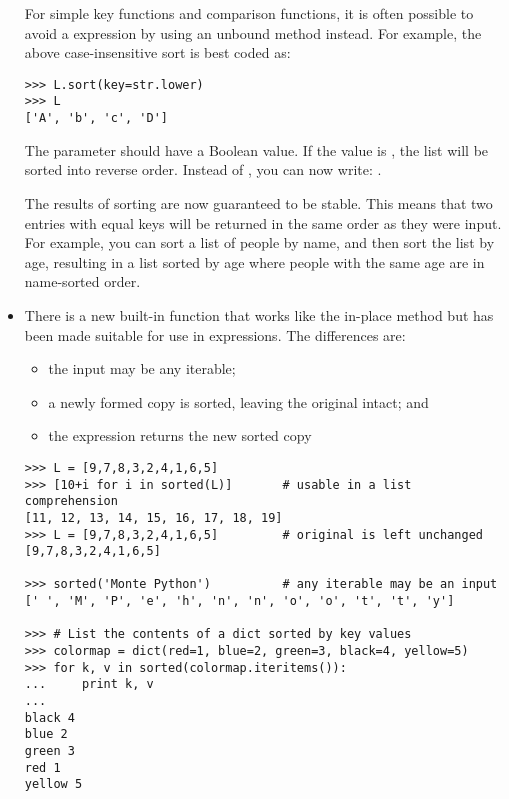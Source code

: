 \documentclass{howto}
\begin{document}
\begin{itemize}
For simple key functions and comparison functions, it is often
possible to avoid a  expression by using an unbound
method instead.  For example, the above case-insensitive sort is best
coded as:

\begin{verbatim}
>>> L.sort(key=str.lower)
>>> L
['A', 'b', 'c', 'D']
\end{verbatim}       

The  parameter should have a Boolean value.  If the value is
, the list will be sorted into reverse order.  Instead
of , you can now write:
.

The results of sorting are now guaranteed to be stable.  This means
that two entries with equal keys will be returned in the same order as
they were input.  For example, you can sort a list of people by name,
and then sort the list by age, resulting in a list sorted by age where
people with the same age are in name-sorted order.

\item There is a new built-in function
 that works like the in-place
 method but has been made suitable for use in
expressions.  The differences are:
  \begin{itemize}
  \item the input may be any iterable;
  \item a newly formed copy is sorted, leaving the original intact; and
  \item the expression returns the new sorted copy
  \end{itemize}

\begin{verbatim}
>>> L = [9,7,8,3,2,4,1,6,5]
>>> [10+i for i in sorted(L)]       # usable in a list comprehension
[11, 12, 13, 14, 15, 16, 17, 18, 19]
>>> L = [9,7,8,3,2,4,1,6,5]         # original is left unchanged
[9,7,8,3,2,4,1,6,5]   

>>> sorted('Monte Python')          # any iterable may be an input
[' ', 'M', 'P', 'e', 'h', 'n', 'n', 'o', 'o', 't', 't', 'y']

>>> # List the contents of a dict sorted by key values
>>> colormap = dict(red=1, blue=2, green=3, black=4, yellow=5)
>>> for k, v in sorted(colormap.iteritems()):
...     print k, v
...
black 4
blue 2
green 3
red 1
yellow 5

\end{verbatim}


\end{itemize}
\end{document}
